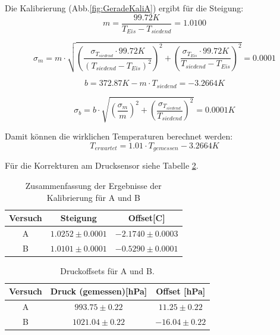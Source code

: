 \documentclass[12pt,a4paper]{article}
\begin{document}
Die Kalibrierung (Abb.\ref{fig:GeradeKaliA}) ergibt für die Steigung:
\begin{equation}
m = \dfrac{99.72K}{T_{Eis}-T_{siedend}} = 1.0100
\end{equation}

\begin{equation}
\sigma_{m} = m\cdot \sqrt{(\dfrac{\sigma_{T_{siedend}}\cdot 99.72K}{(T_{siedend}-T_{Eis})^{2}})^{2}+(\dfrac{\sigma_{T_{Eis}}\cdot 99.72K}{T_{siedend}-T_{Eis}})^{2}} = 0.0001
\end{equation}

\begin{equation}
b = 372.87K-m\cdot T_{siedend} = -3.2664K
\end{equation}

\begin{equation}
\sigma_{b} = b\cdot \sqrt{(\dfrac{\sigma_{m}}{m})^{2}+(\dfrac{\sigma_{T_{siedend}}}{T_{siedend}})^{2}} = 0.0001K
\end{equation}


Damit können die wirklichen Temperaturen berechnet werden:
\begin{equation}
T_{erwartet}=1.01\cdot T_{gemessen}-3.2664K
\end{equation}
 

Für die Korrekturen am Drucksensor siehe Tabelle \ref{tab:Druckoffsets}.

\begin{table}
\begin{center}
\begin{tabular}{|c|c|c|}
\hline
Versuch & Steigung & Offset[C]\\
\hline
A & $1.0252 \pm 0.0001$ & $-2.1740 \pm 0.0003$\\
\hline
B & $1.0101 \pm 0.0001$ & $-0.5290 \pm 0.0001$\\
\hline
\end{tabular}
\end{center}
\caption{Zusammenfassung der Ergebnisse der Kalibrierung für A und B}
\label{tab:KaliErgebnisseAundB}
\end{table}


\begin{table}
\begin{center}
\begin{tabular}{|c|c|c|}
\hline
Versuch & Druck (gemessen)[hPa] & Offset [hPa]\\
\hline
A & $993.75 \pm 0.22$ & $11.25 \pm 0.22$\\
\hline
B & $1021.04 \pm 0.22$ & $-16.04 \pm 0.22$\\
\hline
\end{tabular}
\end{center}
\caption[Offsets]{Druckoffsets für A und B.}
\label{tab:Druckoffsets}
\end{table}
\end{document}

